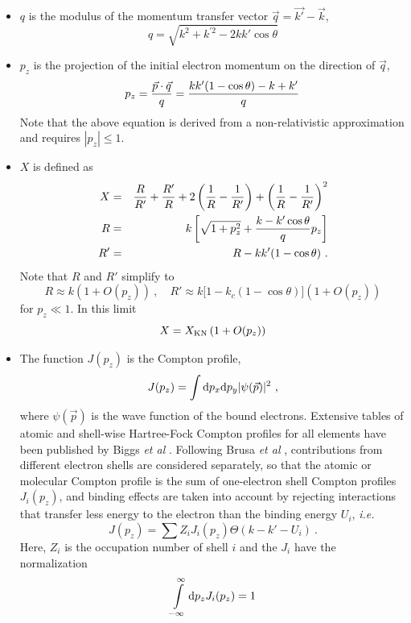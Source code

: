 \begin{itemize}
\item
$q$ is the modulus of the momentum transfer vector
$\vec{q} = \vec{k'} - \vec{k}$,
\begin{equation}
q = \sqrt{k^2 + k^{\prime 2} - 2 k k' \cos \theta}
\end{equation}
\item
$p_z$ is the projection of the initial electron momentum
on the direction of $\vec{q}$,
\begin{equation}
\label{comp_pz}
p_z = {\vec{p} \cdot \vec{q} \over q} =
{k k' (1 - \cos \theta) - k + k' \over q}
\end{equation}
Note that the above equation is derived from a non-relativistic
approximation and requires $|p_z| \le 1$.
\item
$X$ is defined as
\begin{eqnarray}
X & = & {R \over R'} + {R' \over R} +
2 \left(\frac{1}{R} - \frac{1}{R'} \right)
+ \left(\frac{1}{R} - \frac{1}{R'} \right)^2 \nonumber \\
R & = & k \left[ \sqrt{1 + p_z^2} + {k - k' \cos \theta \over q} p_z \right]
\nonumber \\
R' & = & R - k k' (1 - \cos \theta)~.
\end{eqnarray}
Note that $R$ and $R'$ simplify to
\begin{equation}
R \approx k \left(1 + O(p_z) \right)~, \quad
R' \approx k \Big[1 - k_c (1 - \cos \theta ) \Big] \left(1 + O(p_z) \right)
\end{equation}
for $p_z \ll 1$. In this limit
\begin{equation}
X = X_{\rm KN} \left(1 + O(p_z) \right)
\end{equation}
\item
The function $J(p_z)$ is the Compton profile,
\begin{equation}
J(p_z) = \int {\rm d} p_x {\rm d} p_y | \psi(\vec{p}) |^2~,
\end{equation}
where $\psi(\vec{p})$ is the wave function of the bound electrons.
Extensive tables of atomic and shell-wise
Hartree-Fock Compton profiles for all
elements have been published by Biggs {\em et al} \cite{BM75}.
Following Brusa {\em et al} \cite{BS96},
contributions
from different electron shells are considered separately, so
that the atomic or molecular Compton profile is the sum
of one-electron shell Compton profiles $J_i(p_z)$, and binding effects
are taken into account by rejecting interactions that
transfer less energy to the electron than the binding energy $U_i$,
{\em i.e.}
\begin{equation}
J(p_z) = \sum Z_i J_i(p_z) \Theta(k - k' - U_i)~.
\end{equation}
Here, $Z_i$ is the occupation number of shell $i$ and
the $J_i$ have the normalization
\begin{equation}
\int\limits_{-\infty}^\infty {\rm d} p_z J_i(p_z) = 1
\end{equation}
\end{itemize}
